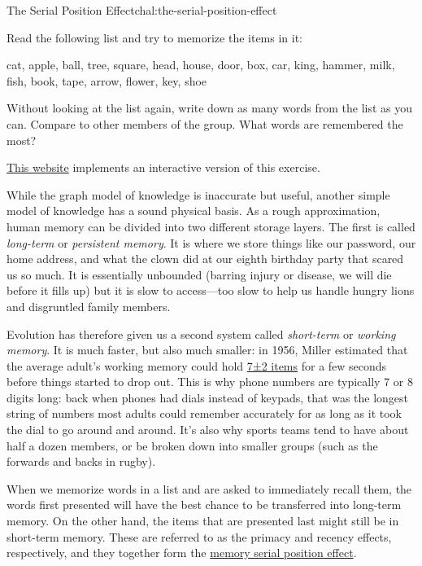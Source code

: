 
\begin{challenge}{The Serial Position Effect}{chal:the-serial-position-effect}

Read the following list and try to memorize the items in it:

cat, apple, ball, tree, square, head, house, door, box, car, king,
hammer, milk, fish, book, tape, arrow, flower, key, shoe

Without looking at the list again, write down as many words from the
list as you can. Compare to other members of the group. What words are
remembered the most?

\href{http://cat.xula.edu/thinker/memory/working/serial}{This website}
implements an interactive version of this exercise.
\end{challenge}

While the graph model of knowledge is inaccurate but useful, another
simple model of knowledge has a sound physical basis. As a rough
approximation, human memory can be divided into two different storage
layers. The first is called \emph{long-term} or \emph{persistent
memory}. It is where we store things like our password, our home
address, and what the clown did at our eighth birthday party that scared
us so much. It is essentially unbounded (barring injury or disease, we
will die before it fills up) but it is slow to access---too slow to help
us handle hungry lions and disgruntled family members.

Evolution has therefore given us a second system called
\emph{short-term} or \emph{working memory}. It is much faster, but also
much smaller: in 1956, Miller estimated that the average adult's working
memory could hold
\href{https://en.wikipedia.org/wiki/The\_Magical\_Number\_Seven,\_Plus\_or\_Minus\_Two}{7±2
items} for a few seconds before things started to drop out. This is why
phone numbers are typically 7 or 8 digits long: back when phones had
dials instead of keypads, that was the longest string of numbers most
adults could remember accurately for as long as it took the dial to go
around and around. It's also why sports teams tend to have about half a
dozen members, or be broken down into smaller groups (such as the
forwards and backs in rugby).

When we memorize words in a list and are asked to immediately recall
them, the words first presented will have the best chance to be
transferred into long-term memory. On the other hand, the items that are
presented last might still be in short-term memory. These are referred
to as the primacy and recency effects, respectively, and they together
form the
\href{https://en.wikipedia.org/wiki/Serial\_position\_effect}{memory
serial position effect}.


